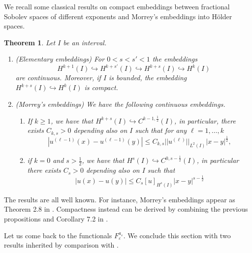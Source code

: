 \documentclass{article}
\newtheorem{Theorem}{Theorem}[section]
\theoremstyle{definition}
\newcommand{\e}{\varepsilon}
\def\e{\varepsilon}
\begin{document}
We recall some classical results on compact embeddings between fractional Sobolev spaces of different exponents and Morrey's embeddings into Hölder spaces.
\begin{Theorem}\label{thm:sobolev_embd}
    Let $I$ be an interval. 
    \begin{enumerate}
        \item (Elementary embeddings) For $0<s<s'<1$ the embeddings 
        \[H^{k+1}(I)\hookrightarrow H^{k+s'}(I) \hookrightarrow H^{k+s}(I) \hookrightarrow H^k(I)\] are continuous. Moreover,  if $I$ is bounded, the embedding $H^{k+s}(I)\hookrightarrow H^k(I)$ is compact.
        \item (Morrey's embeddings) We have the following continuous embeddings.
        \begin{enumerate}
            \item If $k\geq 1$, we have that $H^{k+s}(I)\hookrightarrow C^{k-1,\frac{1}{2}}(I)$,
            in particular, there exists $C_{k,s}>0$ depending also on $I$ such that for any $\ell = 1,\dots, k$
            \[|u^{(\ell-1)}(x)-u^{(\ell-1)}(y)| \leq C_{k,s} ||u^{(\ell)}||_{L^2(I)}|x-y|^\frac{1}{2},\]
            \item if  $k=0$ and $s>\frac{1}{2}$, we have that $H^s(I)\hookrightarrow C^{0,s-\frac{1}{2}}(I)$, in particular there exists $C_{s}>0$ depending also on $I$ such that
            \[|u(x)-u(y)| \leq C_{s} [u]_{H^{s}(I)}|x-y|^{s-\frac{1}{2}}\]
        \end{enumerate} 
    \end{enumerate}
\end{Theorem}
The results are all well known. For instance, Morrey's embeddings appear as Theorem 2.8 in \cite{Leoni_frac_sob_sp}. Compactness instead can be derived by combining the previous propositions and Corollary 7.2 in \cite{Hitchhiker}.
 

Let us come back to the functionals $F^{a_{\scriptstyle\e}}_{\e}$. We conclude this section with two results inherited by comparison with \cite{Solci_2024}.
\end{document}
